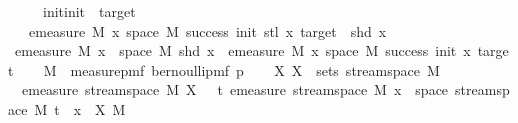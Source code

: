 \begin{isabellebody}
\ \ \ {\isachardoublequoteopen}{}\ {\isacharless}{\kern0pt}\ init{\isachardoublequoteclose}{\isachardoublequoteopen}init\ {\isacharless}{\kern0pt}\ target{\isachardoublequoteclose}\isanewline
\ \ \ {\isachardoublequoteopen}emeasure\ M\ {\isacharbraceleft}{\kern0pt}x{\isasymin}\ space\ M{\isachardot}{\kern0pt}\ success\ {\isacharparenleft}{\kern0pt}init{\isacharplus}{\kern0pt}{}{\isacharparenright}{\kern0pt}\ {\isacharparenleft}{\kern0pt}stl\ x{\isacharparenright}{\kern0pt}\ target\ {\isasymand}\ shd\ x{\isacharbraceright}{\kern0pt}\ \isanewline
{\isacharequal}{\kern0pt}\ emeasure\ M\ {\isacharbraceleft}{\kern0pt}x\ {\isasymin}\ space\ M{\isachardot}{\kern0pt}\ shd\ x{\isacharbraceright}{\kern0pt}\ {\isacharasterisk}{\kern0pt}\ emeasure\ M\ {\isacharbraceleft}{\kern0pt}x{\isasymin}\ space\ M{\isachardot}{\kern0pt}\ success\ {\isacharparenleft}{\kern0pt}init{\isacharplus}{\kern0pt}{}{\isacharparenright}{\kern0pt}\ {\isacharparenleft}{\kern0pt}x{\isacharparenright}{\kern0pt}\ target{\isacharbraceright}{\kern0pt}{\isachardoublequoteclose}\isanewline
%
\isadelimproof
%
\endisadelimproof
%
\isatagproof
{}\isamarkupfalse%
{\isacharminus}{\kern0pt}\isanewline
\ \ \isamarkupfalse%
\ {\isacharquery}{\kern0pt}M\ {\isacharequal}{\kern0pt}\ {\isachardoublequoteopen}measure{\isacharunderscore}{\kern0pt}pmf\ {\isacharparenleft}{\kern0pt}bernoulli{\isacharunderscore}{\kern0pt}pmf\ p{\isacharparenright}{\kern0pt}{\isachardoublequoteclose}\isanewline
\ \ \isamarkupfalse%
\ {\isachardoublequoteopen}{\isasymAnd}X{\isachardot}{\kern0pt}\ X\ {\isasymin}\ sets\ {\isacharparenleft}{\kern0pt}stream{\isacharunderscore}{\kern0pt}space\ {\isacharquery}{\kern0pt}M{\isacharparenright}{\kern0pt}\ {\isasymLongrightarrow}\isanewline
\ \ emeasure\ {\isacharparenleft}{\kern0pt}stream{\isacharunderscore}{\kern0pt}space\ {\isacharquery}{\kern0pt}M{\isacharparenright}{\kern0pt}\ X\ {\isacharequal}{\kern0pt}\ {\isasymintegral}\isactrlsup {\isacharplus}{\kern0pt}\ t{\isachardot}{\kern0pt}\ emeasure\ {\isacharparenleft}{\kern0pt}stream{\isacharunderscore}{\kern0pt}space\ {\isacharquery}{\kern0pt}M{\isacharparenright}{\kern0pt}\ {\isacharbraceleft}{\kern0pt}x\ {\isasymin}\ space\ {\isacharparenleft}{\kern0pt}stream{\isacharunderscore}{\kern0pt}space\ {\isacharquery}{\kern0pt}M{\isacharparenright}{\kern0pt}{\isachardot}{\kern0pt}\ t\ {\isacharhash}{\kern0pt}{\isacharhash}{\kern0pt}\ x\ {\isasymin}\ X{\isacharbraceright}{\kern0pt}\ {\isasympartial}{\isacharquery}{\kern0pt}M{\isachardoublequoteclose}\isanewline

\end{isabellebody}

